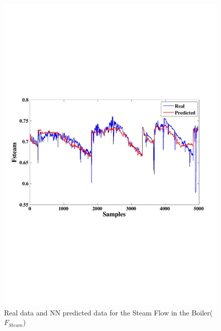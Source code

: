 \begin{figure}
\centering
\includegraphics[width=1\textwidth]{ANN-EXHAUSTRECOVERY.pdf}
\caption{Real data and NN predicted data for the Steam Flow in the Boiler($F_{Steam}$) }
\label{Fboiler}
\end{figure}

